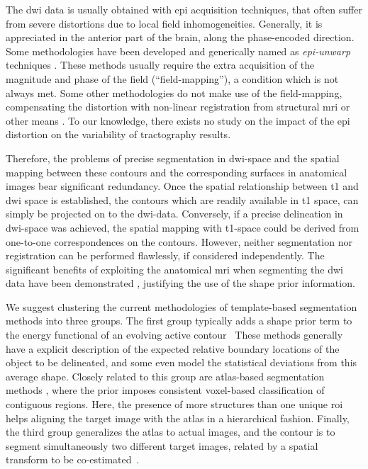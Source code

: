The \gls{dwi} data is usually obtained with \gls{epi}
acquisition techniques, that often suffer from severe distortions due to 
local field inhomogeneities. Generally, it is appreciated in the anterior
part of the brain, along the phase-encoded direction. Some methodologies have
been developed and generically named as \emph{\gls{epi}-unwarp} techniques
\cite{holland_efficient_2010,hsu_correction_2009,jezzard_characterization_2005,
reber_correction_2005}. These methods usually 
require the extra acquisition of the magnitude and phase of
the field (``field-mapping''), a condition which is not always met. Some other 
methodologies do not make use of the field-mapping, compensating the distortion
with non-linear registration from structural \gls{mri} or other means
\citep{andersson_modeling_2001}. To our knowledge, there exists no study
on the impact of the \gls{epi} distortion on the variability of tractography
results. 

Therefore, the problems of precise segmentation in \gls{dwi}-space and the 
spatial mapping between these contours and the corresponding surfaces in 
anatomical images bear significant redundancy. Once the spatial relationship 
between \gls{t1} and \gls{dwi} space is established, the contours which are 
readily available in \gls{t1} space, can simply be projected on to the 
\gls{dwi}-data. Conversely, if a precise delineation in \gls{dwi}-space 
was achieved, the spatial mapping with \gls{t1}-space could be derived 
from one-to-one correspondences on the contours. However, neither segmentation 
nor registration can be performed flawlessly, if considered independently. 
The significant benefits of exploiting the anatomical \gls{mri} when 
segmenting the \gls{dwi} data have been demonstrated \cite{zollei_improved_2010}, 
justifying the use of the shape prior information. 

We suggest clustering the current methodologies of template-based segmentation 
methods into three groups. The first group typically adds a shape prior term to 
the energy functional of an evolving active contour~\citep{Bresson2006a,Chan2005,
Chen2002,Cremers2006,Gastaud2004,Paragios2003,Vemuri2003a,Yezzi2003a} %
These methods generally have a explicit description of the expected relative boundary 
locations of the object to be delineated, and some even model the statistical deviations
from this average shape. Closely related to this group are atlas-based segmentation
methods \citep{Gorthi2011,Gorthi2009,Pohl2005,Pohl2006,Wang2006}, where the prior 
imposes consistent voxel-based classification of contiguous regions. Here, the 
presence of more structures than one unique \gls{roi} helps aligning the target image 
with the atlas in a hierarchical fashion. Finally, the third group generalizes 
the atlas to actual images, and the contour is to segment simultaneously two 
different target images, related by a spatial transform to be co-estimated~\citep{Wyatt2003,
Yezzi2003}.

